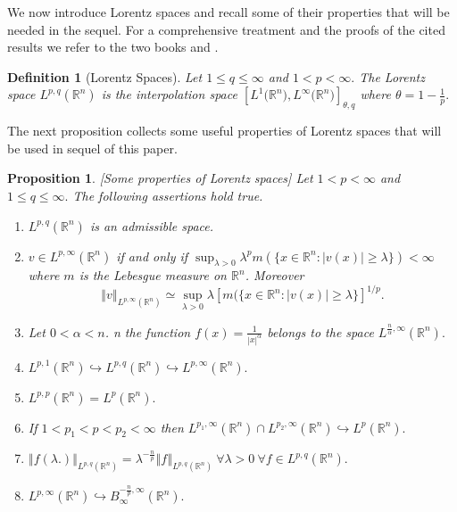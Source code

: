 \documentclass[11pt]{amsart}%
\theoremstyle{plain}
\numberwithin{equation}{section}
\newtheorem{proposition}{Proposition}[section]
\newtheorem{definition}{Definition}[section]
\begin{document}
We now introduce Lorentz spaces and recall some of their properties that will be needed in the sequel. For a comprehensive treatment and the proofs of the cited results we refer to the two books \cite{BL} and \cite{Lem2}.
\begin{definition}[Lorentz Spaces]
Let $1\leq q\leq \infty $ and $1<p<\infty .$ The Lorentz space $L^{p,q}(%
\mathbb{R}^{n})$ is the interpolation space $[L^{1}\mathbb{(}\mathbb{R}%
^{n}),L^{\infty }\mathbb{(}\mathbb{R}^{n})]_{\theta ,q}$ where $\theta =1-%
\frac{1}{p}.$
\end{definition}
The next proposition collects some useful properties of Lorentz spaces that will be used in sequel of this paper.
\begin{proposition}\label{lorentz} [Some properties of Lorentz spaces]
Let $1<p<\infty $ and $1\leq q\leq \infty .$ The following assertions hold true.
\begin{enumerate}
\item $L^{p,q}(\mathbb{R}^{n})$ is an admissible space.
\item $v\in L^{p,\infty }(\mathbb{R}^{n})$ if and only if $\sup_{\lambda
>0}\lambda ^{p}m(\{x\in \mathbb{R}^{n}:\left\vert v(x)\right\vert \geq
\lambda \})<\infty $ where $m$ is the Lebesgue measure on $\mathbb{R}^{n}$. Moreover
\[
\left\Vert v\right\Vert_{L^{p,\infty }(\mathbb{R}^{n})}\simeq \sup_{\lambda
>0}\lambda [m(\{x\in \mathbb{R}^{n}:\left\vert v(x)\right\vert \geq
\lambda \}]^{1/p}.
\]
\item Let $0<\alpha <n$. n the  function $f(x)=\frac{1}{\left\vert x\right\vert ^{\alpha }%
}$ belongs to the space $L^{\frac{n}{\alpha },\infty }(%
\mathbb{R}^{n}).$

\item $L^{p,1}(\mathbb{R}^{n})\hookrightarrow L^{p,q}(\mathbb{R}%
^{n})\hookrightarrow L^{p,\infty }(\mathbb{R}^{n}).$

\item $L^{p,p}(\mathbb{R}^{n})=L^{p}(\mathbb{R}^{n}).$
\item If $1<p_1<p<p_2<\infty$ then $L^{p_1,\infty}(\mathbb{R}^n)\cap L^{p_2,\infty}(\mathbb{R}^n) \hookrightarrow L^p(\mathbb{R}^{n}).$

\item $\left\Vert f(\lambda .)\right\Vert _{L^{p,q}(\mathbb{R}^{n})}=\lambda
^{-\frac{n}{p}}\left\Vert f\right\Vert _{L^{p,q}(\mathbb{R}^{n})}~\forall
\lambda >0~\forall f\in L^{p,q}(\mathbb{R}^{n}).$

\item $L^{p,\infty }(\mathbb{R}^{n})\hookrightarrow B_{\infty }^{-\frac{n}{p}%
,\infty }(\mathbb{R}^{n}).$


\end{enumerate}
\end{proposition}
\end{document}
